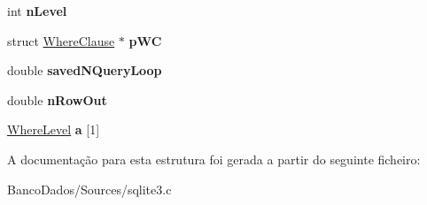 \begin{DoxyCompactItemize}
\item 
\hypertarget{struct_where_info_ab04fa676e481a8df69107201a362c686}{int {\bfseries n\-Level}}\label{struct_where_info_ab04fa676e481a8df69107201a362c686}

\item 
\hypertarget{struct_where_info_aad633b9e8b7ff4046fcfe798729c591a}{struct \hyperlink{struct_where_clause}{Where\-Clause} $\ast$ {\bfseries p\-W\-C}}\label{struct_where_info_aad633b9e8b7ff4046fcfe798729c591a}

\item 
\hypertarget{struct_where_info_a42261b8c4fbc968e0096fa13ea4c00a7}{double {\bfseries saved\-N\-Query\-Loop}}\label{struct_where_info_a42261b8c4fbc968e0096fa13ea4c00a7}

\item 
\hypertarget{struct_where_info_aca7831db346643eddd5520c3bce4b7bb}{double {\bfseries n\-Row\-Out}}\label{struct_where_info_aca7831db346643eddd5520c3bce4b7bb}

\item 
\hypertarget{struct_where_info_a427337160cbeaf64b23a8241fb10dbf9}{\hyperlink{struct_where_level}{Where\-Level} {\bfseries a} \mbox{[}1\mbox{]}}\label{struct_where_info_a427337160cbeaf64b23a8241fb10dbf9}

\end{DoxyCompactItemize}


A documentação para esta estrutura foi gerada a partir do seguinte ficheiro\-:\begin{DoxyCompactItemize}
\item 
Banco\-Dados/\-Sources/sqlite3.\-c\end{DoxyCompactItemize}
